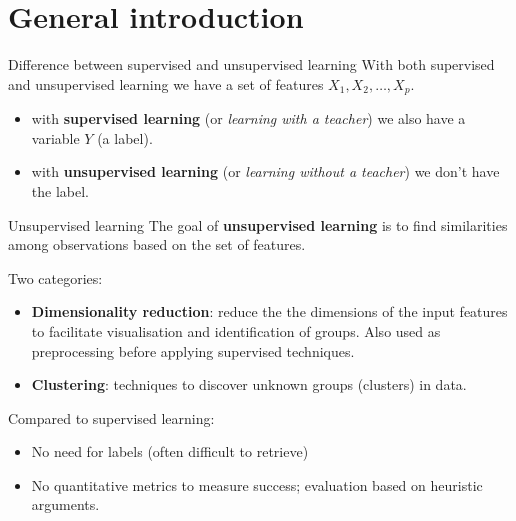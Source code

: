 \documentclass[notes]{beamer}          %
\begin{document}
\section{General introduction}
\begin{frame}{Difference between supervised and unsupervised learning}
With both supervised and unsupervised learning we have a set of features $X_1, X_2, \dots, X_p$.

\vspace{5mm} 

\begin{itemize}
\item with \textbf{supervised learning} (or \textit{learning with a teacher}) we also have a variable $Y$ (a label).
\item with \textbf{unsupervised learning} (or \textit{learning without a teacher}) we don't have the label.
\end{itemize}

\end{frame}


\begin{frame}{Unsupervised learning}
The goal of \textbf{unsupervised learning} is to find similarities among observations based on the set of features.

\vspace{2mm} 

Two categories:
\begin{itemize}
   \item \textbf{Dimensionality reduction}: reduce the the dimensions of the input features to facilitate visualisation and identification of groups. Also used as preprocessing before applying supervised techniques.
   \item \textbf{Clustering}: techniques to discover unknown groups (clusters) in data.
\end{itemize}

\vspace{2mm} 

Compared to supervised learning:
\begin{itemize}
\item No need for labels (often difficult to retrieve)
\item No quantitative metrics to measure success; evaluation based on heuristic arguments.
\end{itemize}

\end{frame}
\end{document}
